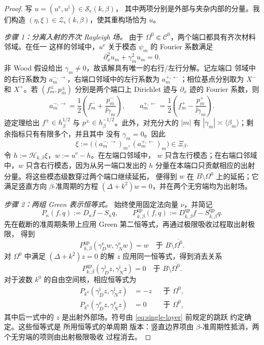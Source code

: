 \begin{proof}
写
$u=(u^{\mathrm e},u^{\mathrm i})\in\mathcal S_{\mathrm c}(k,\beta)$，
其中两项分别是外部与夹杂内部的分量。我们构造
$(\eta,\xi)\in\mathcal Z_{\mathrm c}(k,\beta)$，使其重构场恰为 $u$。

\emph{步骤 1：分离入射的齐次 Rayleigh 场。}
由于 $\Omega^0\Subset\mathcal C^0$，两个端口都具有齐次材料邻域。在任一
这样的邻域中，$u^{\mathrm e}$ 关于模态 $\psi_m$ 的 Fourier 系数满足
\[
  \partial_x^2u_m+\gamma_m^2u_m=0.
\]
非 Wood 假设给出 $\gamma_m\neq0$，故该解具有唯一的右行/左行分解。记左端口
邻域中的右行系数为 $a_m^{-,\rightarrow}$，右端口邻域中的左行系数为
$a_m^{+,\leftarrow}$；相位基点分别取为 $X^-$ 和 $X^+$。若
$(f_m^\pm,p_m^\pm)$ 分别是两个端口上 Dirichlet 迹与 $\partial_x$ 迹的
Fourier 系数，则
\[
  a_m^{-,\rightarrow}
  =\frac12\left(f_m^-+\frac{p_m^-}{\ii\gamma_m}\right),
  \qquad
  a_m^{+,\leftarrow}
  =\frac12\left(f_m^+-\frac{p_m^+}{\ii\gamma_m}\right).
\]
迹定理给出 $f^\pm\in h^{1/2}_\beta$ 与
$p^\pm\in h^{-1/2}_\beta$。此外，对充分大的 $|m|$ 有
$|\gamma_m|\asymp\langle\beta_m\rangle$；剩余指标只有有限多个，并且其中
没有 $\gamma_m=0$。因此
\[
  \xi:=\bigl((a_m^{-,\rightarrow})_m,
             (a_m^{+,\leftarrow})_m\bigr)\in\Xi_\beta.
\]
令 $h:=\mathcal H_{k,\beta}\xi$，$w:=u^{\mathrm e}-h$。在左端口邻域中，
$w$ 只含左行模态；在右端口邻域中，$w$ 只含右行模态，因为从另一端口发出的
$h$ 分量在本端口只贡献相应的出射分量。将这些模态级数穿过两个端口继续延拓，
便得到 $w$ 在 $B\setminus\overline{\Omega^0}$ 上的延拓；它满足竖直方向
$\beta$-准周期的方程 $(\Delta+k^2)w=0$，并在两个无穷端均为出射场。

\emph{步骤 2：两组 Green 表示恒等式。}
始终使用固定法向量 $\nu$，并简记
\[
  P_\kappa(f,q):=D_\kappa f-S_\kappa q,
  \qquad
  P^{\mathrm{qp}}_{k,\beta}(f,q)
  :=D^{\mathrm{qp}}_{k,\beta}f-S^{\mathrm{qp}}_{k,\beta}q.
\]
先在截断的准周期条带上应用 Green 第二恒等式，再通过极限吸收过程取出射极限，
得到
\[
  P^{\mathrm{qp}}_{k,\beta}
  (\gamma_D^{\mathrm e}w,\gamma_N^{\mathrm e}w)
  =w
  \quad\text{于 }B\setminus\overline{\Omega^0}.
\]
对 $\Omega^0$ 中满足 $(\Delta+k^2)z=0$ 的解 $z$ 应用同一恒等式，得到消去关系
\[
  P^{\mathrm{qp}}_{k,\beta}
  (\gamma_D^{\mathrm i}z,\gamma_N^{\mathrm i}z)=0
  \quad\text{于 }B\setminus\overline{\Omega^0}.
\]
对于波数 $k^0$ 的自由空间核，相应恒等式为
\begin{align*}
  P_{k^0}(\gamma_D^{\mathrm i}z,\gamma_N^{\mathrm i}z)
  &=-z&&\text{于 }\Omega^0,\\
  P_{k^0}(\gamma_D^{\mathrm e}z,\gamma_N^{\mathrm e}z)
  &=0&&\text{于 }\Omega^0,
\end{align*}
其中后一式中的 $z$ 是出射外部场。符号由 \eqref{eq:single-layer} 前规定的跳跃
约定确定。这些恒等式是
\cite[Appendix~A, Lemmas~9--10]{BarnettGreengard2010} 所用恒等式的单周期
版本：竖直边界项由 $\beta$-准周期性抵消，两个无穷端的项则由出射极限吸收
过程消去。


\end{proof}
